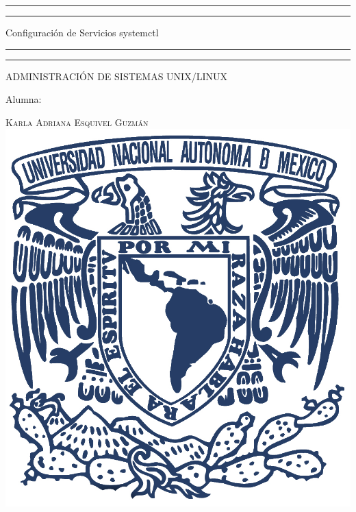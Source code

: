 \documentclass[a4paper, 11pt, oneside]{article}
\begin{document}
 

\begin{titlepage} 

	\centering 
	
	\scshape 
	
	\vspace*{\baselineskip} 
	
	
	
	\rule{\textwidth}{1.6pt}\vspace*{-\baselineskip}\vspace*{2pt} 
	\rule{\textwidth}{0.4pt} 
	
	\vspace{0.75\baselineskip} 
	
	{\LARGE Configuración de Servicios systemctl}	
	\vspace{0.75\baselineskip} 
	
	\rule{\textwidth}{0.4pt}\vspace*{-\baselineskip}\vspace{3.2pt}
	\rule{\textwidth}{1.6pt} 
	
	\vspace{2\baselineskip} 
	

	ADMINISTRACIÓN DE SISTEMAS UNIX/LINUX
	
	\vspace*{3\baselineskip} 
	
	
	
	Alumna:
	
	\vspace{0.5\baselineskip} 
	
	{\scshape\Large Karla Adriana Esquivel Guzmán \\} 
	\vspace{0.5\baselineskip} 
	\vfill
	\includegraphics{unam.jpg}
	

\end{titlepage}
\end{document}
